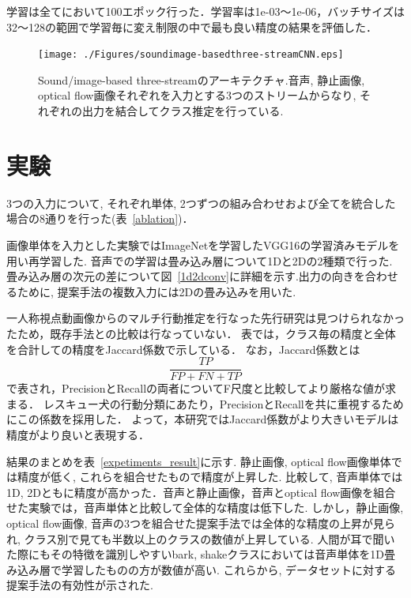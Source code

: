 \documentclass[MIRU,submit]{miru2019j}
\begin{document}
学習は全てにおいて100エポック行った．学習率は1e-03〜1e-06，バッチサイズは32〜128の範囲で学習毎に変え制限の中で最も良い精度の結果を評価した．

\begin{figure}[tb]
   \begin{center}
    \texttt{[image: ./Figures/soundimage-basedthree-streamCNN.eps]}
    \caption{Sound/image-based three-streamのアーキテクチャ.音声, 静止画像, optical flow画像それぞれを入力とする3つのストリームからなり, それぞれの出力を結合してクラス推定を行っている.}
    \label{sound3st}
   \end{center}
\end{figure}

\section{実験}

3つの入力について, それぞれ単体, 2つずつの組み合わせおよび全てを統合した場合の8通りを行った(表~\ref{ablation})．

画像単体を入力とした実験ではImageNetを学習したVGG16の学習済みモデルを用い再学習した.
音声での学習は畳み込み層について1Dと2Dの2種類で行った.
畳み込み層の次元の差について図~\ref{1d2dconv}に詳細を示す.出力の向きを合わせるために, 提案手法の複数入力には2Dの畳み込みを用いた.

一人称視点動画像からのマルチ行動推定を行なった先行研究は見つけられなかったため，既存手法との比較は行なっていない．
表では，クラス毎の精度と全体を合計しての精度をJaccard係数で示している．
なお，Jaccard係数とは$$\frac{TP}{FP+FN+TP}$$で表され，PrecisionとRecallの両者についてF尺度と比較してより厳格な値が求まる．
レスキュー犬の行動分類にあたり，PrecisionとRecallを共に重視するためにこの係数を採用した．
よって，本研究ではJaccard係数がより大きいモデルは精度がより良いと表現する．

結果のまとめを表~\ref{expetiments_result}に示す.
静止画像, optical flow画像単体では精度が低く, これらを組合せたもので精度が上昇した.
比較して, 音声単体では1D, 2Dともに精度が高かった．音声と静止画像，音声とoptical flow画像を組合せた実験では，音声単体と比較して全体的な精度は低下した.
しかし，静止画像, optical flow画像, 音声の3つを組合せた提案手法では全体的な精度の上昇が見られ, クラス別で見ても半数以上のクラスの数値が上昇している.
人間が耳で聞いた際にもその特徴を識別しやすいbark, shakeクラスにおいては音声単体を1D畳み込み層で学習したものの方が数値が高い.
これらから, データセットに対する提案手法の有効性が示された.
\end{document}
